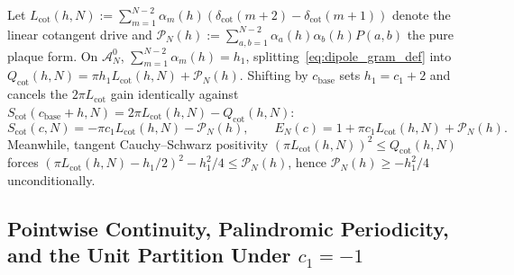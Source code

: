 \documentclass[11pt,a4paper]{article}
\theoremstyle{definition}
\begin{document}
Let $L_{\mathrm{cot}}(h,N) := \sum_{m=1}^{N-2} \alpha_m(h)(\delta_{\mathrm{cot}}(m+2)-\delta_{\mathrm{cot}}(m+1))$ denote the linear cotangent drive and $\mathcal{P}_N(h) := \sum_{a,b=1}^{N-2}\alpha_a(h)\alpha_b(h)P(a,b)$ the pure plaque form. On $\mathcal{A}_N^0$, $\sum_{m=1}^{N-2}\alpha_m(h) = h_1$, splitting~\eqref{eq:dipole_gram_def} into $Q_{\mathrm{cot}}(h,N) = \pi h_1 L_{\mathrm{cot}}(h,N) + \mathcal{P}_N(h)$. Shifting by $c_{\mathrm{base}}$ sets $h_1 = c_1 + 2$ and cancels the $2\pi L_{\mathrm{cot}}$ gain identically against $S_{\mathrm{cot}}(c_{\mathrm{base}}+h,N) = 2\pi L_{\mathrm{cot}}(h,N) - Q_{\mathrm{cot}}(h,N)$:
\begin{equation}\label{eq:scot_plaque}
S_{\mathrm{cot}}(c, N) = -\pi c_1 L_{\mathrm{cot}}(h, N) - \mathcal{P}_N(h),
\qquad
E_N(c) = 1 + \pi c_1 L_{\mathrm{cot}}(h, N) + \mathcal{P}_N(h).
\end{equation}
Meanwhile, tangent Cauchy--Schwarz positivity $(\pi L_{\mathrm{cot}}(h,N))^2 \le Q_{\mathrm{cot}}(h,N)$ forces $(\pi L_{\mathrm{cot}}(h,N) - h_1/2)^2 - h_1^2/4 \le \mathcal{P}_N(h)$, hence $\mathcal{P}_N(h) \ge -h_1^2/4$ unconditionally.

\subsection{Pointwise Continuity, Palindromic Periodicity, and the Unit Partition Under $c_1 = -1$}
\end{document}
